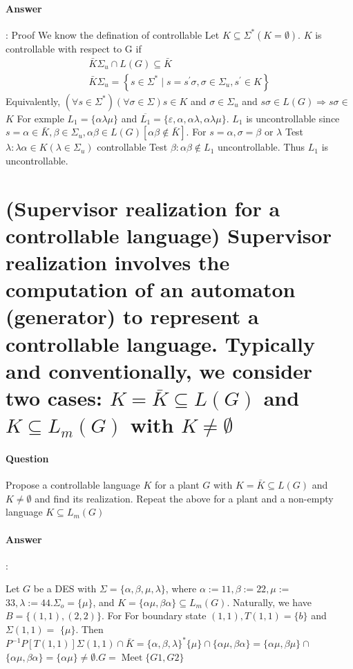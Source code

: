 \documentclass{article}
\begin{document}
\paragraph{Answer}:
Proof We know the defination of controllable Let $K \subseteq \Sigma^*(K=\emptyset)$. $K$ is controllable with respect to $\mathrm{G}$ if
$$
\begin{array}{r}
\bar{K} \Sigma_u \cap L(G) \subseteq \bar{K} \\
\bar{K} \Sigma_u=\left\{s \in \Sigma^* \mid s=s^{\prime} \sigma, \sigma \in \Sigma_u, s^{\prime} \in K\right\}
\end{array}
$$
Equivalently, $\left(\forall s \in \Sigma^*\right)(\forall \sigma \in \Sigma) s \in K$ and $\sigma \in \Sigma_u$ and $s \sigma \in L(G) \Rightarrow s \sigma \in$
$K$
For exmple $L_1=\{\alpha \lambda \mu\}$ and $\overline{L_1}=\{\varepsilon, \alpha, \alpha \lambda, \alpha \lambda \mu\}$. $L_1$ is uncontrollable since $s=\alpha \in \bar{K}, \beta \in \Sigma_u, \alpha \beta \in L(G)[\alpha \beta \notin \bar{K}]$. For $s=\alpha, \sigma=\beta$ or $\lambda$
Test $\lambda: \lambda \alpha \in K\left(\lambda \in \Sigma_u\right)$ controllable
Test $\beta: \alpha \beta \notin L_1$ uncontrollable. Thus $L_1$ is uncontrollable.


\section{(Supervisor realization for a controllable language) Supervisor realization involves the computation of an automaton (generator) to represent a controllable language. Typically and conventionally, we consider two cases: $K=\bar{K} \subseteq L(G)$ and $K \subseteq L_m(G)$ with $K \neq \emptyset$}
\paragraph{Question} Propose a controllable language $K$ for a plant $G$ with $K = \bar{K} \subseteq L(G)$ and $K \neq  \emptyset$ and find its realization. Repeat the above for a plant and a non-empty language $K \subseteq L_m(G)$

\paragraph{Answer}:


Let $G$ be a DES with $\Sigma=\{\alpha, \beta, \mu, \lambda\}$, where $\alpha:=11, \beta:=22, \mu:=$ $33, \lambda:=44 . \Sigma_o=\{\mu\}$, and $K=\{\alpha \mu, \beta \alpha\} \subseteq L_m(G)$. Naturally, we have $B=\{(1,1),(2,2)\}$. For For boundary state $(1,1), T(1,1)=\{b\}$ and $\Sigma(1,1)=$ $\{\mu\}$. Then $P^{-1} P[T(1,1)] \Sigma(1,1) \cap \bar{K}=\{\alpha, \beta, \lambda\}^*\{\mu\} \cap\{\alpha \mu, \beta \alpha\}=\{\alpha \mu, \beta \mu\} \cap$ $\{\alpha \mu, \beta \alpha\}=\{\alpha \mu\} \neq \emptyset . G=\operatorname{Meet}\{G 1, G 2\}$
\end{document}

